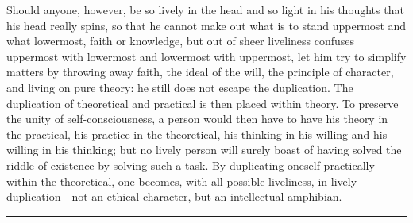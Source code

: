 \documentclass[12pt,a4paper]{article}
\newcommand{\opage}[1]{\marginnote{\footnotesize\textit{[#1]}}}
\begin{document}
Should anyone, however, be so lively in the head and so light in his
thoughts that his head really spins, so that he cannot make out what
is to stand uppermost and what lowermost, faith or knowledge, but out
of sheer liveliness confuses uppermost with lowermost and lowermost
with uppermost, let him try to simplify matters by throwing away
faith, the ideal of the will, the principle of character, and living
on pure theory: he still does not escape the duplication. The
duplication of theoretical and practical is then placed within theory.
To preserve the unity of self-consciousness, a person would
\opage{77}then have to have his theory in the practical, his practice
in the theoretical, his thinking in his willing and his willing in his
thinking; but no lively person will surely boast of having solved the
riddle of existence by solving such a task. By duplicating oneself
practically within the theoretical, one becomes, with all possible
liveliness, in lively duplication---not an ethical character, but an
intellectual amphibian.

\begin{center}\rule{0.2\linewidth}{0.4pt}\end{center}
\end{document}
